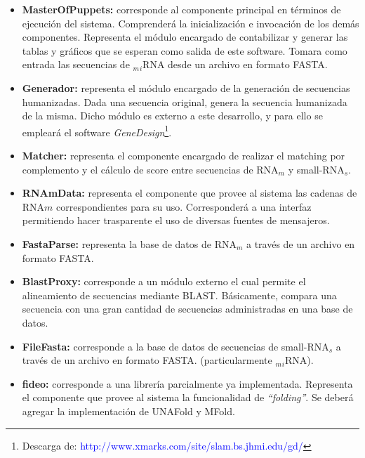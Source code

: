 \documentclass[12pt,a4paper,spanish]{article}
\begin{document}
\begin{itemize}
  \item \textbf{MasterOfPuppets:} corresponde al componente principal en términos de ejecución del sistema. Comprenderá
  la inicialización e invocación de los demás componentes. Representa el módulo encargado de contabilizar y generar 
  las tablas y gráficos que se esperan como salida de este software. Tomara como entrada las secuencias de $_m$$_i$RNA
  desde un archivo en formato FASTA.

  \item \textbf{Generador:} representa el módulo encargado de la generación de secuencias humanizadas. Dada una 		 
  secuencia original, genera la secuencia humanizada de la misma. Dicho módulo es externo a este desarrollo, y para ello  
  se empleará el software \emph{GeneDesign}\footnote{Descarga de: 
  \textcolor{blue}{http://www.xmarks.com/site/slam.bs.jhmi.edu/gd/}}.

  \item \textbf{Matcher:} representa el componente encargado de realizar el matching por complemento y el cálculo de score
  entre secuencias de RNA$_m$ y small-RNA$_s$. 

  \item \textbf{RNAmData:} representa el componente que provee al sistema las cadenas de RNA$m$ correspondientes para su 	uso. Corresponderá a una interfaz permitiendo hacer trasparente el uso de diversas fuentes de mensajeros.

  \item \textbf{FastaParse:} representa la base de datos de RNA$_m$ a través de un archivo en formato FASTA.

  \item \textbf{BlastProxy:} corresponde a un módulo externo el cual permite el alineamiento de secuencias mediante BLAST. 	 Básicamente, compara una secuencia con una gran cantidad de secuencias administradas en una base de datos.

  \item \textbf{FileFasta:} corresponde a la base de datos de secuencias de small-RNA$_s$ a través de un archivo en   
  formato FASTA. (particularmente $_m$$_i$RNA).

  \item \textbf{fideo:} corresponde a una librería parcialmente ya implementada. Representa el componente que provee al
  sistema la funcionalidad de \emph{``folding''}. Se deberá agregar la implementación de \textsf{UNAFold} y \textsf{MFold}.


\end{itemize}
\end{document}
